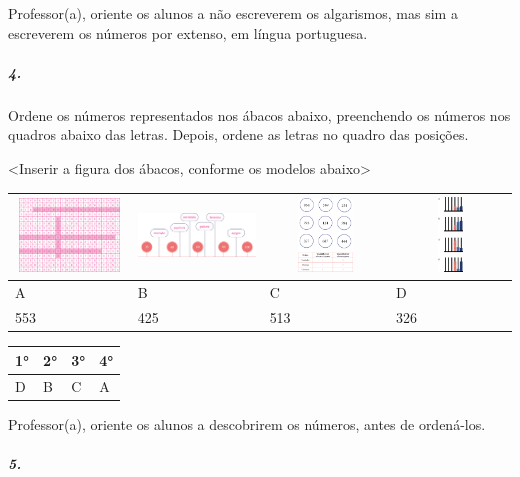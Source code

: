Professor(a), oriente os alunos a não escreverem os algarismos, mas sim
a escreverem os números por extenso, em língua portuguesa.

\subparagraph{4. }\label{section-3}

Ordene os números representados nos ábacos abaixo, preenchendo os
números nos quadros abaixo das letras. Depois, ordene as letras no
quadro das posições.

\textless{}Inserir a figura dos ábacos, conforme os modelos
abaixo\textgreater{}

\begin{longtable}[]{@{}llll@{}}
\toprule
\includegraphics[width=1.24938in,height=0.76667in]{media/image13.png} &
\includegraphics[width=1.35417in,height=0.78502in]{media/image14.png} &
\includegraphics[width=1.29167in,height=0.76677in]{media/image15.png} &
\includegraphics[width=1.25000in,height=0.78248in]{media/image16.png}\tabularnewline
\midrule
\endhead
A & B & C & D\tabularnewline
553 & 425 & 513 & 326\tabularnewline
\bottomrule
\end{longtable}

\begin{longtable}[]{@{}llll@{}}
\toprule
\textbf{1°} & \textbf{2°} & \textbf{3°} & \textbf{4°}\tabularnewline
\midrule
\endhead
D & B & C & A\tabularnewline
\bottomrule
\end{longtable}

Professor(a), oriente os alunos a descobrirem os números, antes de
ordená-los.

\subparagraph{5. }\label{section-4}

